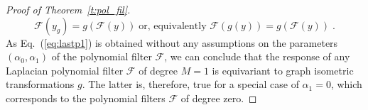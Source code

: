 \documentclass[10pt,journal,compsoc]{IEEEtran}
\begin{document}
\begin{proof}[Proof of Theorem~\ref{t:pol_fil}]
		\begin{equation}
		\mathcal{F}(y_g) = g \left(\mathcal{F}(y) \right)\; \text{or, equivalently }	\mathcal{F}\left(g(y) \right) = g \left(\mathcal{F}(y) \right)\; .
		\label{eq:lastp1}
		\end{equation}
		\noindent
		As Eq.~(\ref{eq:lastp1}) is obtained without any assumptions on the parameters $(\alpha_0, \alpha_1)$ of the polynomial filter $\mathcal{F}$, we can conclude that the response of any Laplacian polynomial filter $\mathcal{F}$ of degree $M=1$ is equivariant to graph isometric transformations $g$. The latter is, therefore, true for a special case of $\alpha_1 = 0$, which corresponds to the polynomial filters $\mathcal{F}$ of degree zero.


\end{proof}
\end{document}
